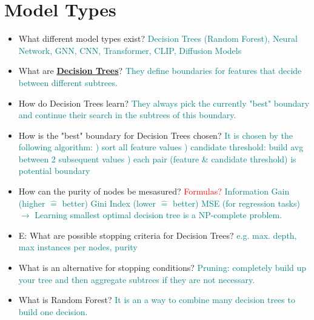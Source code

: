 \documentclass{report}
\newcommand{\asw}[2][teal]{}
\renewcommand{\asw}[2][teal]{\textcolor{#1}{#2}}
\newcommand{\qst}[2][red]{\textcolor{#1}{#2}}
\begin{document}
	\section{Model Types}
	
	\begin{itemize}
		\item What different model types exist?
		\asw{\newline Decision Trees (Random Forest), Neural Network, GNN, CNN, Transformer, CLIP, Diffusion Models}
		
		\item What are \textbf{\underline{Decision Trees}}?
		\asw{\newline They define boundaries for features that decide between different subtrees.}
		\item How do Decision Trees learn?
		\asw{\newline They always pick the currently "best" boundary and continue their search in the subtrees of this boundary.}
		\item How is the "best" boundary for Decision Trees chosen?
		\asw{\newline It is chosen by the following algorithm:
			) sort all feature values
			\newline 2) candidate threshold: build avg between 2 subsequent values
			\newline 3) each pair (feature \& candidate threshold) is potential boundary}
		\item How can the purity of nodes be mesasured? \qst{Formulas?}
		\asw{\newline Information Gain (higher $\widehat{=}$ better)
			\newline Gini Index (lower $\widehat{=}$ better)
			\newline MSE (for regression tasks)
			\newline $\rightarrow$ Learning smallest optimal decision tree is a NP-complete problem.}
		\item E: What are possible stopping criteria for Decision Trees?
		\asw{\newline e.g. max. depth, max instances per nodes, purity}
		\item What is an alternative for stopping conditions?
		\asw{\newline Pruning: completely build up your tree and then aggregate subtrees if they are not necessary.}
		\item What is Random Forest?
		\asw{\newline It is an a way to combine many decision trees to build one decision.}

\end{itemize}
\end{document}
